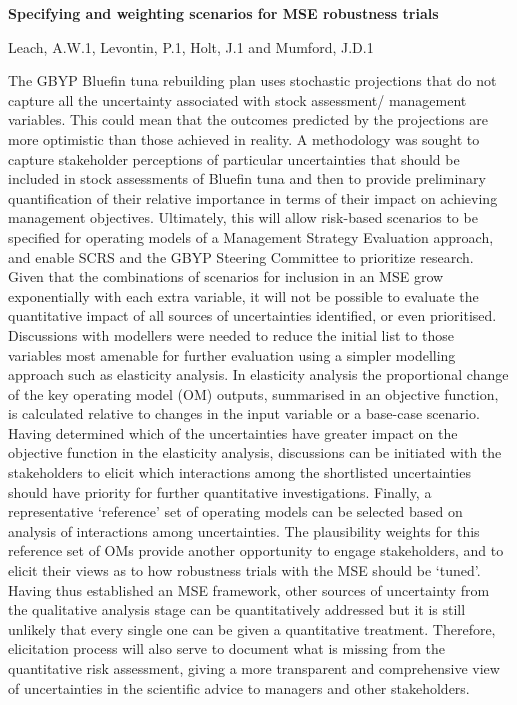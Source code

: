 \textbf{Specifying and weighting scenarios for MSE robustness trials}

Leach, A.W.1, Levontin, P.1, Holt, J.1 and Mumford, J.D.1

The GBYP Bluefin tuna rebuilding plan uses stochastic projections that do not capture all the uncertainty associated with stock assessment/ management variables.  This could mean that the outcomes predicted by the projections are more optimistic than those achieved in reality.  A methodology was sought to capture stakeholder perceptions of particular uncertainties that should be included in stock assessments of Bluefin tuna and then to provide preliminary quantification of their relative importance in terms of their impact on achieving management objectives. Ultimately, this will allow risk-based scenarios to be specified for operating models of a Management Strategy Evaluation approach, and enable SCRS and the GBYP Steering Committee to prioritize research.  Given that the combinations of scenarios for inclusion in an MSE grow exponentially with each extra variable, it will not be possible to evaluate the quantitative impact of all sources of uncertainties identified, or even prioritised. Discussions with modellers were needed to reduce the initial list to those variables most amenable for further evaluation using a simpler modelling approach such as elasticity analysis. In elasticity analysis the proportional change of the key operating model (OM) outputs, summarised in an objective function, is calculated relative to changes in the input variable or a base-case scenario. Having determined which of the uncertainties have greater impact on the objective function in the elasticity analysis, discussions can be initiated with the stakeholders to elicit which interactions among the shortlisted uncertainties should have priority for further quantitative investigations. Finally, a representative ‘reference’ set of operating models can be selected based on analysis of interactions among uncertainties. The plausibility weights for this reference set of OMs provide another opportunity to engage stakeholders, and to elicit their views as to how robustness trials with the MSE should be ‘tuned’. Having thus established an MSE framework, other sources of uncertainty from the qualitative analysis stage can be quantitatively addressed but it is still unlikely that every single one can be given a quantitative treatment.  Therefore, elicitation process will also serve to document what is missing from the quantitative risk assessment, giving a more transparent and comprehensive view of uncertainties in the scientific advice to managers and other stakeholders.

